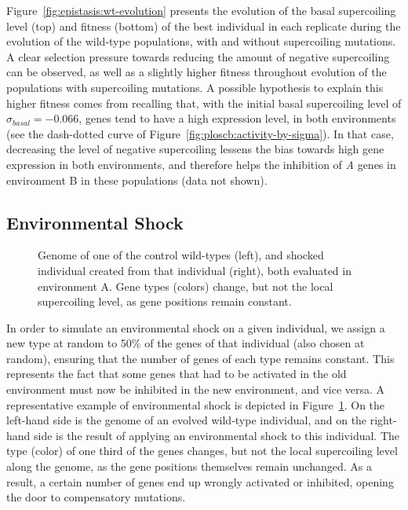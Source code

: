 Figure~\ref{fig:epistasis:wt-evolution} presents the evolution of the basal supercoiling level (top) and fitness (bottom) of the best individual in each replicate during the evolution of the wild-type populations, with and without supercoiling mutations.
A clear selection pressure towards reducing the amount of negative supercoiling can be observed, as well as a slightly higher fitness throughout evolution of the populations with supercoiling mutations.
A possible hypothesis to explain this higher fitness comes from recalling that, with the initial basal supercoiling level of $\sigma_{basal} = -0.066$, genes tend to have a high expression level, in both environments (see the dash-dotted curve of Figure~\ref{fig:ploscb:activity-by-sigma}).
In that case, decreasing the level of negative supercoiling lessens the bias towards high gene expression in both environments, and therefore helps the inhibition of \emph{A} genes in environment B in these populations (data not shown).

\subsection{Environmental Shock}

\begin{figure}
\centering
\begin{elasticrow}[width=\textwidth]
\end{elasticrow}
\caption[Evolved wild-type individual before and after an environmental shock]{Genome of one of the control wild-types (left), and shocked individual created from that individual (right), both evaluated in environment A.
Gene types (colors) change, but not the local supercoiling level, as gene positions remain constant.}
\label{fig:epistasis:shock}
\end{figure}

In order to simulate an environmental shock on a given individual, we assign a new type at random to 50\% of the genes of that individual (also chosen at random), ensuring that the number of genes of each type remains constant.
This represents the fact that some genes that had to be activated in the old environment must now be inhibited in the new environment, and vice versa.
A representative example of environmental shock is depicted in Figure~\ref{fig:epistasis:shock}.
On the left-hand side is the genome of an evolved wild-type individual, and on the right-hand side is the result of applying an environmental shock to this individual.
The type (color) of one third of the genes changes, but not the local supercoiling level along the genome, as the gene positions themselves remain unchanged.
As a result, a certain number of genes end up wrongly activated or inhibited, opening the door to compensatory mutations.

